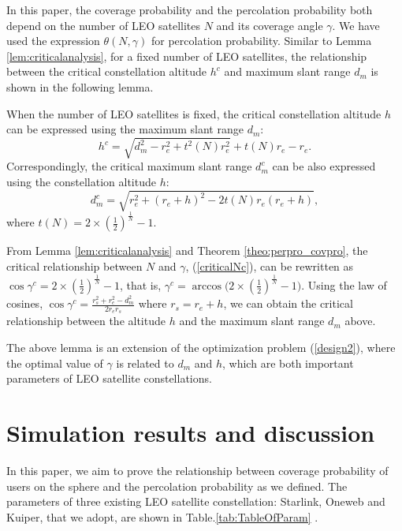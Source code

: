 \documentclass[final]{IEEEtran}
\begin{document}
In this paper, the coverage probability and the percolation probability both depend on the number of LEO satellites $N$ and its coverage angle $\gamma$. We have used the expression $\theta(N,\gamma)$ for percolation probability. Similar to Lemma \ref{lem:criticalanalysis}, for a fixed number of LEO satellites, the relationship between the critical constellation altitude $h^c$ and maximum slant range $d_m$ is shown in the following lemma.
\begin{lemma}
    When the number of LEO satellites is fixed, the critical constellation altitude $h$ can be expressed using the maximum slant range $d_m$:
    \begin{equation}
        h^c = \sqrt{d_m^2-r_e^2+t^2(N) r_e^2}+t(N)r_e-r_e.
        \label{criticalaltitude}
    \end{equation}
    Correspondingly, the critical maximum slant range $d_m^c$ can be also expressed using the constellation altitude $h$:
    \begin{equation}
        d_m^c=\sqrt{r_e^2+(r_e+h)^2-2t(N)r_e(r_e+h)},
    \end{equation}
    where $t(N)=2\times(\frac{1}{2})^{\frac{1}{N}}-1$.
\end{lemma}
\begin{IEEEproof}
    From Lemma \ref{lem:criticalanalysis} and Theorem \ref{theo:perpro_covpro}, the critical relationship between $N$ and $\gamma$, (\ref{criticalNc}), can be rewritten as $\cos{\gamma^c}=2\times(\frac{1}{2})^{\frac{1}{N}}-1$, that is, $\gamma^c=\arccos{\big(2\times(\frac{1}{2})^{\frac{1}{N}}-1\big)}$. Using the law of cosines, $\cos{\gamma^c}=\frac{r_s^2+r_e^2-d_m^2}{2r_e r_s}$ where $r_s=r_e+h$, we can obtain the critical relationship between the altitude $h$ and the maximum slant range $d_m$ above.
\end{IEEEproof}
The above lemma is an extension of the optimization problem (\ref{design2}), where the optimal value of $\gamma$ is related to $d_m$ and $h$, which are both important parameters of LEO satellite constellations.
\section{Simulation results and discussion}
In this paper, we aim to prove the relationship between coverage probability of users on the sphere and the percolation probability as we defined. The parameters of three existing LEO satellite constellation: Starlink, Oneweb and Kuiper, that we adopt, are shown in Table.\ref{tab:TableOfParam} \cite{osoro2021techno,cakaj2021parameters}.
\end{document}
